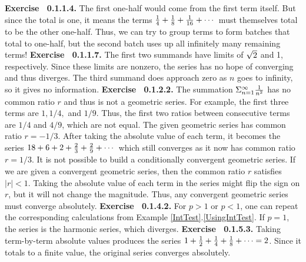 \par 
 {\noindent \protect \bf  Exercise ~0.1.1.4.} The first one-half would come from the first term itself. But since the total is one, it means the terms $\protect \frac  {1}{4}+\protect \frac  {1}{8}+\protect \frac  {1}{16}+\protect \cdots  $ must themselves total to be the other one-half. Thus, we can try to group terms to form batches that total to one-half, but the second batch uses up all infinitely many remaining terms!  \protect \newline  \protect \newline  
 {\noindent \protect \bf  Exercise ~0.1.1.7.} The first two summands have limits of $\protect \sqrt  {2}$ and 1, respectively. Since these limits are nonzero, the series has no hope of converging and thus diverges. The third summand does approach zero as $n$ goes to infinity, so it gives no information. \protect \newline  \protect \newline  
 {\noindent \protect \bf  Exercise ~0.1.2.2.} \textbullet The summation $\Sigma _{n=1}^\infty \protect \frac  {1}{n^2}$ has no common ratio $r$ and thus is not a geometric series. For example, the first three terms are $1,1/4,$ and $1/9$. Thus, the first two ratios between consecutive terms are $1/4$ and $4/9$, which are not equal. \textbullet The given geometric series has common ratio $r=-1/3$. After taking the absolute value of each term, it becomes the series $18+6+2+\protect \frac  {2}{3}+\protect \frac  {2}{9}+\protect \cdots  $ which still converges as it now has common ratio $r=1/3$. \textbullet It is not possible to build a conditionally convergent geometric series. If we are given a convergent geometric series, then the common ratio $r$ satisfies $|r|<1$. Taking the absolute value of each term in the series might flip the sign on $r$, but it will not change the magnitude. Thus, any convergent geometric series must converge absolutely. \protect \newline  \protect \newline  
 {\noindent \protect \bf  Exercise ~0.1.4.2.} For $p>1$ or $p<1$, one can repeat the corresponding calculations from Example \protect \ref  {IntTest}.\protect \ref  {UsingIntTest}. If $p=1$, the series is the harmonic series, which diverges. \protect \newline  \protect \newline  
 {\noindent \protect \bf  Exercise ~0.1.5.3.} Taking term-by-term absolute values produces the series $1+\protect \frac  {1}{2}+\protect \frac  {1}{4}+\protect \frac  {1}{8}+\protect \cdots  =2$. Since it totals to a finite value, the original series converges absolutely. \protect \newline  \protect \newline  
